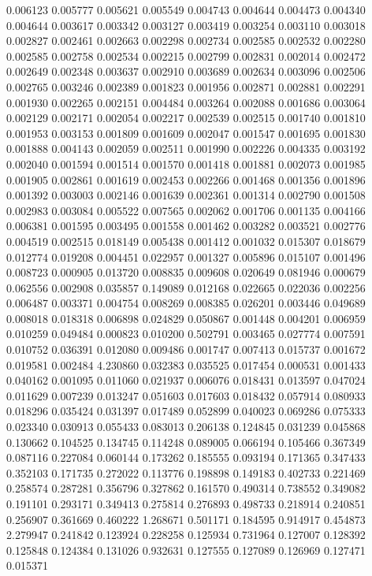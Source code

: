 0.006123
0.005777
0.005621
0.005549
0.004743
0.004644
0.004473
0.004340
0.004644
0.003617
0.003342
0.003127
0.003419
0.003254
0.003110
0.003018
0.002827
0.002461
0.002663
0.002298
0.002734
0.002585
0.002532
0.002280
0.002585
0.002758
0.002534
0.002215
0.002799
0.002831
0.002014
0.002472
0.002649
0.002348
0.003637
0.002910
0.003689
0.002634
0.003096
0.002506
0.002765
0.003246
0.002389
0.001823
0.001956
0.002871
0.002881
0.002291
0.001930
0.002265
0.002151
0.004484
0.003264
0.002088
0.001686
0.003064
0.002129
0.002171
0.002054
0.002217
0.002539
0.002515
0.001740
0.001810
0.001953
0.003153
0.001809
0.001609
0.002047
0.001547
0.001695
0.001830
0.001888
0.004143
0.002059
0.002511
0.001990
0.002226
0.004335
0.003192
0.002040
0.001594
0.001514
0.001570
0.001418
0.001881
0.002073
0.001985
0.001905
0.002861
0.001619
0.002453
0.002266
0.001468
0.001356
0.001896
0.001392
0.003003
0.002146
0.001639
0.002361
0.001314
0.002790
0.001508
0.002983
0.003084
0.005522
0.007565
0.002062
0.001706
0.001135
0.004166
0.006381
0.001595
0.003495
0.001558
0.001462
0.003282
0.003521
0.002776
0.004519
0.002515
0.018149
0.005438
0.001412
0.001032
0.015307
0.018679
0.012774
0.019208
0.004451
0.022957
0.001327
0.005896
0.015107
0.001496
0.008723
0.000905
0.013720
0.008835
0.009608
0.020649
0.081946
0.000679
0.062556
0.002908
0.035857
0.149089
0.012168
0.022665
0.022036
0.002256
0.006487
0.003371
0.004754
0.008269
0.008385
0.026201
0.003446
0.049689
0.008018
0.018318
0.006898
0.024829
0.050867
0.001448
0.004201
0.006959
0.010259
0.049484
0.000823
0.010200
0.502791
0.003465
0.027774
0.007591
0.010752
0.036391
0.012080
0.009486
0.001747
0.007413
0.015737
0.001672
0.019581
0.002484
4.230860
0.032383
0.035525
0.017454
0.000531
0.001433
0.040162
0.001095
0.011060
0.021937
0.006076
0.018431
0.013597
0.047024
0.011629
0.007239
0.013247
0.051603
0.017603
0.018432
0.057914
0.080933
0.018296
0.035424
0.031397
0.017489
0.052899
0.040023
0.069286
0.075333
0.023340
0.030913
0.055433
0.083013
0.206138
0.124845
0.031239
0.045868
0.130662
0.104525
0.134745
0.114248
0.089005
0.066194
0.105466
0.367349
0.087116
0.227084
0.060144
0.173262
0.185555
0.093194
0.171365
0.347433
0.352103
0.171735
0.272022
0.113776
0.198898
0.149183
0.402733
0.221469
0.258574
0.287281
0.356796
0.327862
0.161570
0.490314
0.738552
0.349082
0.191101
0.293171
0.349413
0.275814
0.276893
0.498733
0.218914
0.240851
0.256907
0.361669
0.460222
1.268671
0.501171
0.184595
0.914917
0.454873
2.279947
0.241842
0.123924
0.228258
0.125934
0.731964
0.127007
0.128392
0.125848
0.124384
0.131026
0.932631
0.127555
0.127089
0.126969
0.127471
0.015371
